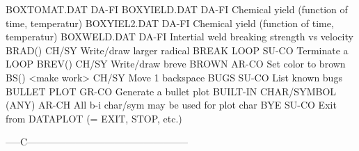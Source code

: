 BOXTOMAT.DAT                DA-FI 
BOXYIELD.DAT                DA-FI Chemical yield (function of time, temperatur)
BOXYIEL2.DAT                DA-FI Chemical yield (function of time, temperatur)
BOXWELD.DAT                 DA-FI Intertial weld breaking strength vs velocity
BRAD()                      CH/SY Write/draw larger radical
BREAK LOOP                  SU-CO Terminate a LOOP
BREV()                      CH/SY Write/draw breve
BROWN                       AR-CO Set color to brown
BS() <make work>            CH/SY Move 1 backspace
BUGS                        SU-CO List known bugs
BULLET PLOT                 GR-CO Generate a bullet plot
BUILT-IN CHAR/SYMBOL (ANY)  AR-CH All b-i char/sym may be used for plot char
BYE                         SU-CO Exit from DATAPLOT (= EXIT, STOP, etc.)

-----C--------------------------------------------------

